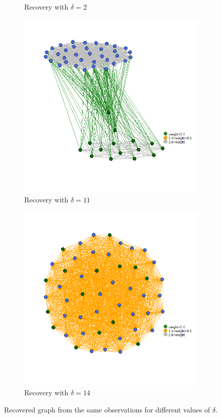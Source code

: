\documentclass[12pt]{amsart}
\theoremstyle{remark}
\begin{document}
\begin{figure}[h]
\begin{subfigure}[b]{0.37\textwidth}
         \caption{Recovery with $\delta=2$}
     \end{subfigure}
     \hfill
     \begin{subfigure}[b]{0.37\textwidth}
         \centering
         \includegraphics[width=\textwidth]{./Pictures/recupera7.png}
         \caption{Recovery with $\delta=11$}
     \end{subfigure}
      \hfill
     \begin{subfigure}[b]{0.37\textwidth}
         \centering
         \includegraphics[width=\textwidth]{./Pictures/recupera8.png}
         \caption{Recovery with $\delta=14$}
     \end{subfigure}
        \caption{Recovered graph from the same observations for different values of $\delta$. }
        \label{fig:recupera}
\end{figure}
\end{document}
